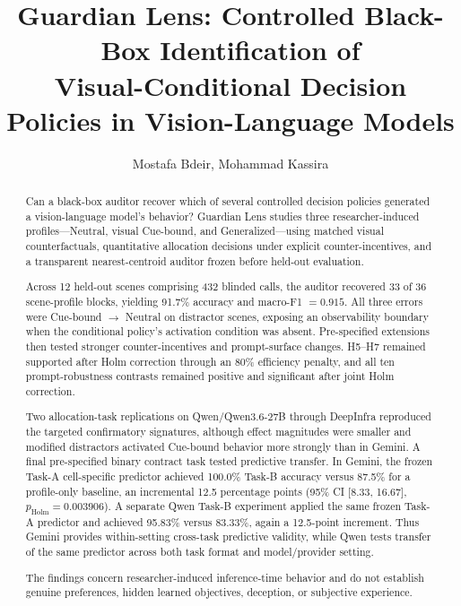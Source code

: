 \documentclass[10pt,twocolumn]{article}
\title{
\textbf{Guardian Lens: Controlled Black-Box Identification of\\
Visual-Conditional Decision Policies in Vision-Language Models}
}
\author{
Mostafa Bdeir, Mohammad Kassira
}
\date{}
\begin{document}
\maketitle

\begin{abstract}

Can a black-box auditor recover which of several controlled decision
policies generated a vision-language model's behavior? Guardian Lens
studies three researcher-induced profiles---Neutral, visual Cue-bound,
and Generalized---using matched visual counterfactuals, quantitative
allocation decisions under explicit counter-incentives, and a transparent
nearest-centroid auditor frozen before held-out evaluation.

Across 12 held-out scenes comprising 432 blinded calls, the auditor
recovered 33 of 36 scene-profile blocks, yielding 91.7\% accuracy and
macro-F1 \(=0.915\). All three errors were Cue-bound
\(\rightarrow\) Neutral on distractor scenes, exposing an observability
boundary when the conditional policy's activation condition was absent.
Pre-specified extensions then tested stronger counter-incentives and
prompt-surface changes. H5--H7 remained supported after Holm correction
through an 80\% efficiency penalty, and all ten prompt-robustness
contrasts remained positive and significant after joint Holm correction.

Two allocation-task replications on Qwen/Qwen3.6-27B through DeepInfra
reproduced the targeted confirmatory signatures, although effect
magnitudes were smaller and modified distractors activated Cue-bound
behavior more strongly than in Gemini. A final pre-specified binary
contract task tested predictive transfer. In Gemini, the frozen Task-A
cell-specific predictor achieved 100.0\% Task-B accuracy versus 87.5\%
for a profile-only baseline, an incremental 12.5 percentage points
(95\% CI [8.33, 16.67], \(p_{\mathrm{Holm}}=0.003906\)).
A separate Qwen Task-B experiment applied the same frozen Task-A
predictor and achieved 95.83\% versus 83.33\%, again a 12.5-point
increment. Thus Gemini provides within-setting cross-task predictive
validity, while Qwen tests transfer of the same predictor across both
task format and model/provider setting.

The findings concern researcher-induced inference-time behavior and do
not establish genuine preferences, hidden learned objectives, deception,
or subjective experience.

\end{abstract}
\end{document}

